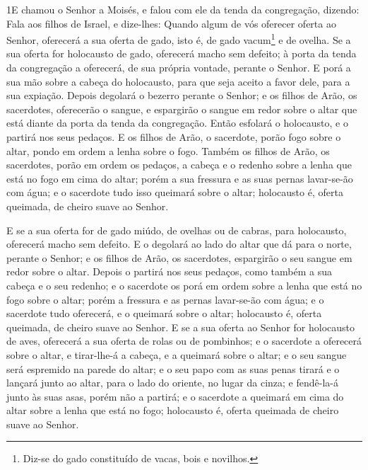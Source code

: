 
\lettrine{1} E chamou o Senhor a Moisés, e falou com ele da
tenda da congregação, dizendo: Fala aos filhos de Israel, e
dize-lhes: Quando algum de vós oferecer oferta ao Senhor, oferecerá
a sua oferta de gado, isto é, de gado vacum\footnote{Diz-se do gado
constituído de vacas, bois e novilhos.} e de ovelha. Se a sua
oferta for holocausto de gado, oferecerá macho sem defeito; à porta
da tenda da congregação a oferecerá, de sua própria vontade, perante
o Senhor. E porá a sua mão sobre a cabeça do holocausto, para
que seja aceito a favor dele, para a sua expiação. Depois
degolará o bezerro perante o Senhor; e os filhos de Arão, os
sacerdotes, oferecerão o sangue, e espargirão o sangue em redor
sobre o altar que está diante da porta da tenda da congregação.
Então esfolará o holocausto, e o partirá nos seus pedaços. E
os filhos de Arão, o sacerdote, porão fogo sobre o altar, pondo em
ordem a lenha sobre o fogo. Também os filhos de Arão, os
sacerdotes, porão em ordem os pedaços, a cabeça e o redenho sobre a
lenha que está no fogo em cima do altar; porém a sua fressura e
as suas pernas lavar-se-ão com água; e o sacerdote tudo isso
queimará sobre o altar; holocausto é, oferta queimada, de cheiro
suave ao Senhor.

E se a sua oferta for de gado miúdo, de ovelhas ou de cabras,
para holocausto, oferecerá macho sem defeito. E o degolará ao
lado do altar que dá para o norte, perante o Senhor; e os filhos de
Arão, os sacerdotes, espargirão o seu sangue em redor sobre o altar.
Depois o partirá nos seus pedaços, como também a sua cabeça e
o seu redenho; e o sacerdote os porá em ordem sobre a lenha que está
no fogo sobre o altar; porém a fressura e as pernas
lavar-se-ão com água; e o sacerdote tudo oferecerá, e o queimará
sobre o altar; holocausto é, oferta queimada, de cheiro suave ao
Senhor. E se a sua oferta ao Senhor for holocausto de aves,
oferecerá a sua oferta de rolas ou de pombinhos; e o
sacerdote a oferecerá sobre o altar, e tirar-lhe-á a cabeça, e a
queimará sobre o altar; e o seu sangue será espremido na parede do
altar; e o seu papo com as suas penas tirará e o lançará
junto ao altar, para o lado do oriente, no lugar da cinza; e
fendê-la-á junto às suas asas, porém não a partirá; e o sacerdote a
queimará em cima do altar sobre a lenha que está no fogo; holocausto
é, oferta queimada de cheiro suave ao Senhor.

\medskip

